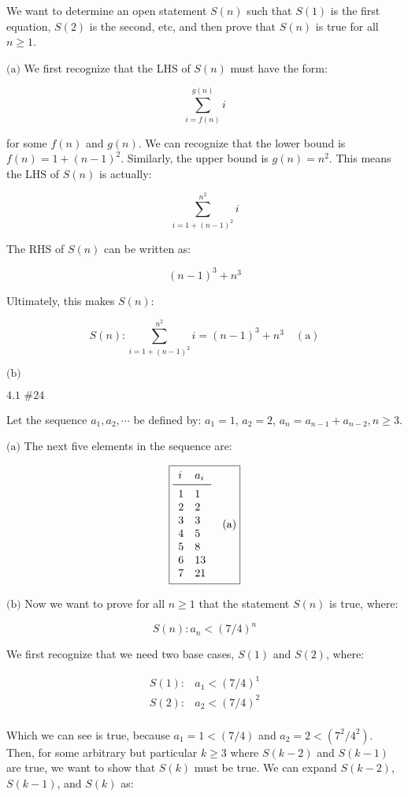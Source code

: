 \documentclass{article}
\newcommand{\problem}[2]{$\boxed{\text{#1 \##2}}$}
\newcommand{\subproblem}[1]{$\boxed{\text{(#1)}}$}
\newcommand{\subsolution}[2]{\boxed{#2\quad(\text{#1})}}
\newcommand{\multistep}[1]{\begin{array}{rl} #1 \end{array}}
\begin{document}
We want to determine an open statement $S(n)$ such that $S(1)$ is the
first equation, $S(2)$ is the second, etc, and then prove that $S(n)$
is true for all $n\ge1$.

%
\subproblem{a} We first recognize that the LHS of $S(n)$ must have the
form:

\[
\sum\limits_{i=f(n)}^{g(n)} i
\]

for some $f(n)$ and $g(n)$. We can recognize that the lower bound is
$f(n)=1+(n-1)^2$. Similarly, the upper bound is $g(n)=n^2$. This means
the LHS of $S(n)$ is actually:

\[
\sum\limits_{i=1+(n-1)^2}^{n^2} i
\]

The RHS of $S(n)$ can be written as:

\[
(n-1)^3+n^3
\]

Ultimately, this makes $S(n)$:

\[
\subsolution{a}{S(n):\sum\limits_{i=1+(n-1)^2}^{n^2} i=(n-1)^3+n^3}
\]

%
\subproblem{b}

%
\problem{4.1}{24}

Let the sequence $a_1,a_2,\cdots$ be defined by: $a_1=1$, $a_2=2$,
$a_n=a_{n-1}+a_{n-2},n\ge3$.

%
\subproblem{a} The next five elements in the sequence are:

\[
\subsolution{a}{
\begin{array}{lll}
i & a_i \\
\midrule
1 & 1 \\
2 & 2 \\
3 & 3 \\
4 & 5 \\
5 & 8 \\
6 & 13 \\
7 & 21 \\
\end{array}
}
\]

%
\subproblem{b} Now we want to prove for all $n\ge1$ that the statement
$S(n)$ is true, where:

\[
S(n):a_n<(7/4)^n
\]

We first recognize that we need two base cases, $S(1)$ and $S(2)$,
where:

\[
\multistep{
S(1):&a_1<(7/4)^1 \\
S(2):&a_2<(7/4)^2 \\
}
\]

Which we can see is true, because $a_1=1<(7/4)$ and
$a_2=2<(7^2/4^2)$. Then, for some arbitrary but particular $k\ge3$
where $S(k-2)$ and $S(k-1)$ are true, we want to show that $S(k)$ must
be true. We can expand $S(k-2)$, $S(k-1)$, and $S(k)$ as:
\end{document}

